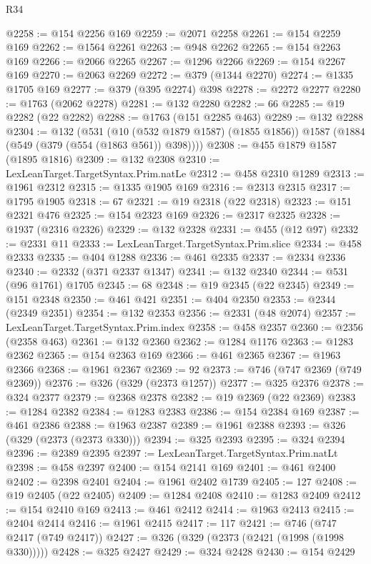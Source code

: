 \begin{lexlean}{R34}
\begin{coremodule}
@2258 := @154 @2256 @169
@2259 := @2071 @2258
@2261 := @154 @2259 @169
@2262 := @1564 @2261
@2263 := @948 @2262
@2265 := @154 @2263 @169
@2266 := @2066 @2265
@2267 := @1296 @2266
@2269 := @154 @2267 @169
@2270 := @2063 @2269
@2272 := @379 (@1344 @2270)
@2274 := @1335 @1705 @169
@2277 := @379 (@395 @2274) @398
@2278 := @2272 @2277
@2280 := @1763 (@2062 @2278)
@2281 := @132 @2280
@2282 := 66
@2285 := @19 @2282 (@22 @2282)
@2288 := @1763 (@151 @2285 @463)
@2289 := @132 @2288
@2304 := @132
    (@531
      (@10 (@532 @1879 @1587) (@1855 @1856))
      @1587
      (@1884 (@549 (@379 (@554 (@1863 @561)) @398))))
@2308 := @455 @1879 @1587 (@1895 @1816)
@2309 := @132 @2308
@2310 := LexLeanTarget.TargetSyntax.Prim.natLe
@2312 := @458 @2310 @1289
@2313 := @1961 @2312
@2315 := @1335 @1905 @169
@2316 := @2313 @2315
@2317 := @1795 @1905
@2318 := 67
@2321 := @19 @2318 (@22 @2318)
@2323 := @151 @2321 @476
@2325 := @154 @2323 @169
@2326 := @2317 @2325
@2328 := @1937 (@2316 @2326)
@2329 := @132 @2328
@2331 := @455 (@12 @97)
@2332 := @2331 @11
@2333 := LexLeanTarget.TargetSyntax.Prim.slice
@2334 := @458 @2333
@2335 := @404 @1288
@2336 := @461 @2335
@2337 := @2334 @2336
@2340 := @2332 (@371 @2337 @1347)
@2341 := @132 @2340
@2344 := @531 (@96 @1761) @1705
@2345 := 68
@2348 := @19 @2345 (@22 @2345)
@2349 := @151 @2348
@2350 := @461 @421
@2351 := @404 @2350
@2353 := @2344 (@2349 @2351)
@2354 := @132 @2353
@2356 := @2331 (@48 @2074)
@2357 := LexLeanTarget.TargetSyntax.Prim.index
@2358 := @458 @2357
@2360 := @2356 (@2358 @463)
@2361 := @132 @2360
@2362 := @1284 @1176
@2363 := @1283 @2362
@2365 := @154 @2363 @169
@2366 := @461 @2365
@2367 := @1963 @2366
@2368 := @1961 @2367
@2369 := 92
@2373 := @746 (@747 @2369 (@749 @2369))
@2376 := @326 (@329 (@2373 @1257))
@2377 := @325 @2376
@2378 := @324 @2377
@2379 := @2368 @2378
@2382 := @19 @2369 (@22 @2369)
@2383 := @1284 @2382
@2384 := @1283 @2383
@2386 := @154 @2384 @169
@2387 := @461 @2386
@2388 := @1963 @2387
@2389 := @1961 @2388
@2393 := @326 (@329 (@2373 (@2373 @330)))
@2394 := @325 @2393
@2395 := @324 @2394
@2396 := @2389 @2395
@2397 := LexLeanTarget.TargetSyntax.Prim.natLt
@2398 := @458 @2397
@2400 := @154 @2141 @169
@2401 := @461 @2400
@2402 := @2398 @2401
@2404 := @1961 @2402 @1739
@2405 := 127
@2408 := @19 @2405 (@22 @2405)
@2409 := @1284 @2408
@2410 := @1283 @2409
@2412 := @154 @2410 @169
@2413 := @461 @2412
@2414 := @1963 @2413
@2415 := @2404 @2414
@2416 := @1961 @2415
@2417 := 117
@2421 := @746 (@747 @2417 (@749 @2417))
@2427 := @326 (@329 (@2373 (@2421 (@1998 (@1998 @330)))))
@2428 := @325 @2427
@2429 := @324 @2428
@2430 := @154 @2429

\end{coremodule}
\end{lexlean}

